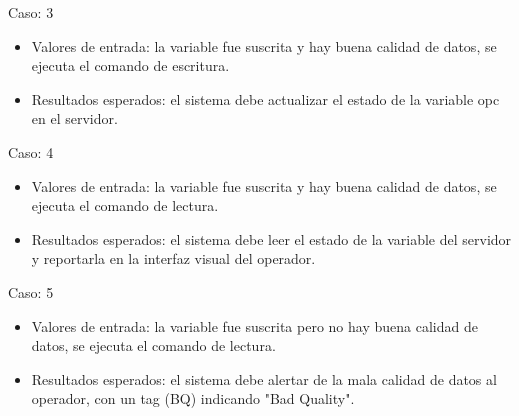 \documentclass[]{scrreprt}
\begin{document}
Caso: 3
\begin{itemize}
	\item Valores de entrada: la variable fue suscrita y hay buena calidad de datos, se ejecuta el comando de escritura.
	\item Resultados esperados: el sistema debe actualizar el estado de la variable opc en el servidor.
\end{itemize}

Caso: 4
\begin{itemize}
	\item Valores de entrada: la variable fue suscrita y hay buena calidad de datos, se ejecuta el comando de lectura.
	\item Resultados esperados: el sistema debe leer el estado de la variable del servidor y reportarla en la interfaz visual del operador.
\end{itemize}

Caso: 5
\begin{itemize}
	\item Valores de entrada: la variable fue suscrita pero no hay buena calidad de datos, se ejecuta el comando de lectura.
	\item Resultados esperados: el sistema debe alertar de la mala calidad de datos al operador, con un tag (BQ) indicando "Bad Quality". 
\end{itemize}
\end{document}

